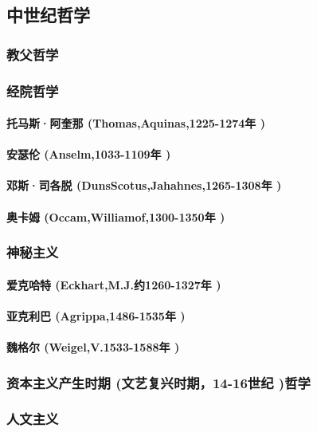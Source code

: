 \documentclass[UTF8]{../RepresentationUniverse}
\begin{document}
\subsection{中世纪哲学}
\subsubsection{教父哲学}
\subsubsection{经院哲学}
    \paragraph{托马斯·阿奎那 (Thomas,Aquinas,1225-1274年 )}
    \paragraph{安瑟伦 (Anselm,1033-1109年 )}
    \paragraph{邓斯·司各脱 (DunsScotus,Jahahnes,1265-1308年 )}
    \paragraph{奥卡姆 (Occam,Williamof,1300-1350年 )}
\subsubsection{神秘主义}
    \paragraph{爱克哈特 (Eckhart,M.J.约1260-1327年 )}
    \paragraph{亚克利巴 (Agrippa,1486-1535年 )}
    \paragraph{魏格尔 (Weigel,V.1533-1588年 )}
\subsubsection{资本主义产生时期 (文艺复兴时期，14-16世纪 )哲学}
\subsubsection{人文主义}
\end{document}
